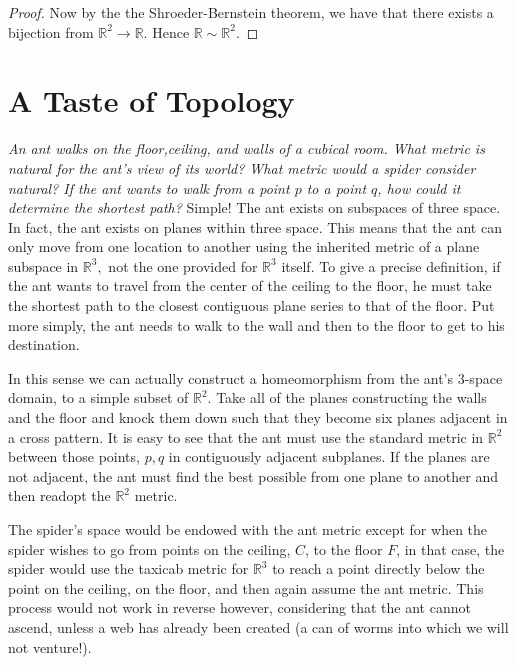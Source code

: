 \documentclass[letter]{article}
\newenvironment{menumerate}{%
  \edef\backupindent{\the\parindent}%
  \enumerate%
  \setlength{\parindent}{\backupindent}%
}{\endenumerate}
\begin{document}
\begin{menumerate}
\begin{proof}
		 		Now by the the Shroeder-Bernstein theorem, we have that there exists a bijection from $\mathbb{R}^2 \to \mathbb{R}.$ Hence $\mathbb{R} \sim \mathbb{R}^2.$
		 	\end{proof}

\end{menumerate}


\section{A Taste of Topology}
\begin{menumerate}
	\item \textit{An ant walks on the floor,ceiling, and walls of a cubical room. What metric is natural for the ant's view of its world? What metric would a spider consider natural? If the ant wants to walk from a point $p$ to a point $q$, how could it determine the shortest path?} Simple! The ant exists on subspaces of three space. In fact, the ant exists on planes within three space. This means that the ant can only move from one location to another using the inherited metric of a plane subspace in $\mathbb{R}^3,$ not the one provided for $\mathbb{R}^3$ itself. To give a precise definition, if the ant wants to travel from the center of the ceiling to the floor, he must take the shortest path to the closest contiguous plane series to that of the floor. Put more simply, the ant needs to walk to the wall and then to the floor to get to his destination.

	 In this sense we can actually construct a homeomorphism from the ant's $3$-space domain, to a simple subset of $\mathbb{R}^2.$ Take all of the planes constructing the walls and the floor and knock them down such that they become six planes adjacent in a cross pattern. It is easy to see that the ant must use the standard metric in $\mathbb{R}^2$ between those points, $p,q$ in contiguously adjacent subplanes. If the planes are not adjacent, the ant must find the best possible from one plane to another and then readopt the $\mathbb{R}^2$ metric.

	 The spider's space would be endowed with the ant metric except for when the spider wishes to go from points on the ceiling, $C$, to the floor $F$, in that case, the spider would use the taxicab metric for $\mathbb{R}^3$ to reach a point directly below the point on the ceiling, on the floor, and then again assume the ant metric. This process would not work in reverse however, considering that the ant cannot ascend, unless a web has already been created (a can of worms into which we will not venture!).


\end{menumerate}
\end{document}
